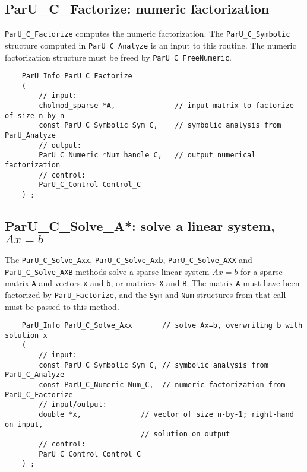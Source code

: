 \documentclass[12pt]{article}
\begin{document}
\subsection{{\sf ParU\_C\_Factorize}: numeric factorization}

    \verb'ParU_C_Factorize' computes the numeric factorization.  The
    \verb'ParU_C_Symbolic' structure computed in \verb'ParU_C_Analyze' is an
    input to this routine.  The numeric factorization structure must be freed
    by \verb'ParU_C_FreeNumeric'.

    {\footnotesize
    \begin{verbatim}
    ParU_Info ParU_C_Factorize
    (
        // input:
        cholmod_sparse *A,              // input matrix to factorize of size n-by-n
        const ParU_C_Symbolic Sym_C,    // symbolic analysis from ParU_Analyze
        // output:
        ParU_C_Numeric *Num_handle_C,   // output numerical factorization
        // control:
        ParU_C_Control Control_C
    ) ; \end{verbatim} }

\subsection{{\sf ParU\_C\_Solve\_A*}: solve a linear system, $Ax=b$}

    The \verb'ParU_C_Solve_Axx',  \verb'ParU_C_Solve_Axb',
    \verb'ParU_C_Solve_AXX' and \verb'ParU_C_Solve_AXB' methods solve a sparse
    linear system $Ax=b$ for a sparse matrix \verb'A' and vectors \verb'x' and
    \verb'b', or matrices \verb'X' and \verb'B'.  The matrix \verb'A' must have
    been factorized by \verb'ParU_Factorize', and the \verb'Sym' and \verb'Num'
    structures from that call must be passed to this method.

    {\footnotesize
    \begin{verbatim}
    ParU_Info ParU_C_Solve_Axx       // solve Ax=b, overwriting b with solution x
    (
        // input:
        const ParU_C_Symbolic Sym_C, // symbolic analysis from ParU_C_Analyze
        const ParU_C_Numeric Num_C,  // numeric factorization from ParU_C_Factorize
        // input/output:
        double *x,              // vector of size n-by-1; right-hand on input,
                                // solution on output
        // control:
        ParU_C_Control Control_C
    ) ; \end{verbatim} }
\end{document}

